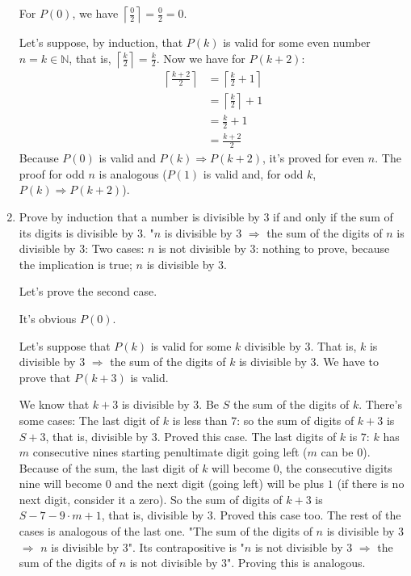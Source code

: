 \documentclass{article}
\begin{document}
\begin{enumerate}
  For $P(0)$, we have $\left \lceil\frac{0}{2} \right \rceil = \frac{0}{2} = 0$.
  
  Let's suppose, by induction, that $P(k)$ is valid for some even number $n = k \in \mathbb{N}$, that is, $\left \lceil\frac{k}{2} \right \rceil = \frac{k}{2}$. Now we have for $P(k+2)$:
  \begin{equation*}
      \begin{aligned}
        \left \lceil\frac{k + 2}{2} \right \rceil &= \left \lceil\frac{k}{2} + 1\right \rceil\\
        &= \left \lceil\frac{k}{2}\right \rceil + 1\\
        &= \frac{k}{2} + 1\\
        &= \frac{k + 2}{2}
      \end{aligned}
  \end{equation*}
  Because $P(0)$ is valid and $P(k) \Rightarrow P(k+2)$, it's proved for even $n$. The proof for odd $n$ is analogous ($P(1)$ is valid and, for odd $k$, $P(k) \Rightarrow P(k+2)$).
  \bigbreak
  \item Prove by induction that a number is divisible by 3 if and only if the sum of its digits is divisible by 3.
  \bigbreak
  "$n$ is divisible by $3$ $\Rightarrow$ the sum of the digits of $n$ is divisible by $3$:
  \bigbreak
  Two cases:
  \subitem $n$ is not divisible by $3$: nothing to prove, because the implication is true;
  \subitem $n$ is divisible by $3$.
  
  Let's prove the second case.
  
  It's obvious $P(0)$.
  
  Let's suppose that $P(k)$ is valid for some $k$ divisible by $3$. That is, $k$ is divisible by $3$ $\Rightarrow$ the sum of the digits of $k$ is divisible by $3$. We have to prove that $P(k + 3)$ is valid.
  
  We know that $k + 3$ is divisible by $3$. Be $S$ the sum of the digits of $k$. There's some cases:
  \subitem The last digit of $k$ is less than $7$: so the sum of digits of $k + 3$ is $S + 3$, that is, divisible by $3$. Proved this case.
  \subitem The last digits of $k$ is $7$: $k$ has $m$ consecutive nines starting penultimate digit going left ($m$ can be $0$). Because of the sum, the last digit of $k$ will become $0$, the consecutive digits nine will become $0$ and the next digit (going left) will be plus $1$ (if there is no next digit, consider it a zero). So the sum of digits of $k + 3$ is $S - 7 - 9\cdot m + 1$, that is, divisible by $3$. Proved this case too.
  \subitem The rest of the cases is analogous of the last one.
  \bigbreak
  "The sum of the digits of $n$ is divisible by $3$ $\Rightarrow$ $n$ is divisible by $3$". Its contrapositive is "$n$ is not divisible by $3$ $\Rightarrow$ the sum of the digits of $n$ is not divisible by $3$". Proving this is analogous.
  

\end{enumerate}
\end{document}
